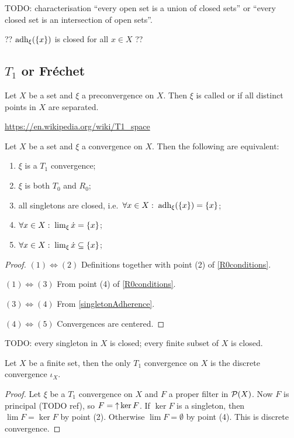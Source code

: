 TODO: characterisation  ``every open set is a union of closed sets'' or
``every closed set is an intersection of open sets''.

?? $\operatorname{adh}_\xi(\{x\})$ is closed for all $x\in X$ ??

\subsection{$T_1$ or Fréchet}
\begin{definition}
Let $X$ be a set and $\xi$ a preconvergence on $X$. Then $\xi$ is called  or  if all distinct points in $X$ are separated.
\end{definition}
\url{https://en.wikipedia.org/wiki/T1_space}

\begin{proposition} \label{FrechetCharacterisation}
Let $X$ be a set and $\xi$ a convergence on $X$. Then the following are equivalent:
\begin{enumerate}
\item $\xi$ is a $T_1$ convergence;
\item $\xi$ is both $T_0$ and $R_0$;
\item all singletons are closed, i.e.\ $\forall x\in X: \; \operatorname{adh}_\xi(\{x\}) = \{x\}$;
\item $\forall x\in X: \; \lim_\xi\dot{x} = \{x\}$;
\item $\forall x\in X: \; \lim_\xi \dot{x} \subseteq \{x\}$;
\end{enumerate}
\end{proposition}
\begin{proof}
$(1) \Leftrightarrow (2)$ Definitions together with point (2) of \ref{R0conditions}.

$(1) \Leftrightarrow (3)$ From point (4) of \ref{R0conditions}.

$(3) \Leftrightarrow (4)$ From \ref{singletonAdherence}.

$(4) \Leftrightarrow (5)$ Convergences are centered.
\end{proof}
TODO: every singleton in $X$ is closed;  every finite subset of $X$ is closed.
\begin{corollary} \label{finiteConvergenceDiscrete}
Let $X$ be a finite set, then the only $T_1$ convergence on $X$ is the discrete convergence $\iota_X$.
\end{corollary}
\begin{proof}
Let $\xi$ be a $T_1$ convergence on $X$ and $F$ a proper filter in $\operatorname{\mathcal{P}}(X)$. Now $F$ is principal (TODO ref), so $F = \operatorname{\uparrow} \ker F$. If $\ker F$ is a singleton, then $\lim F = \ker F$ by point (2). Otherwise $\lim F = \emptyset$ by point (4). This is discrete convergence.
\end{proof}

